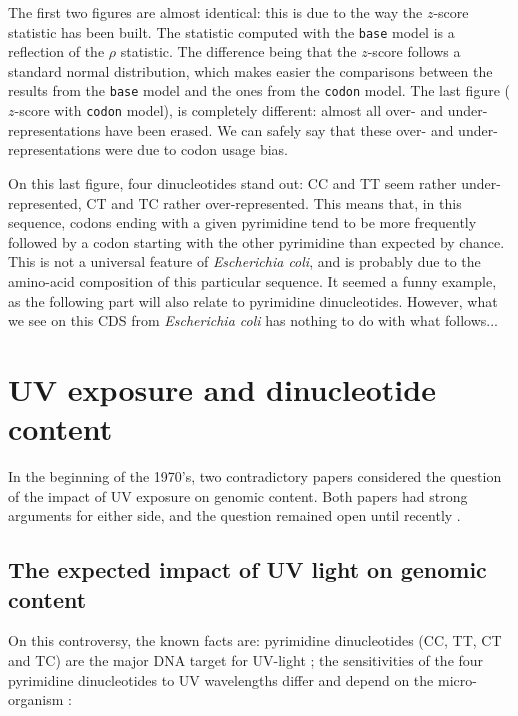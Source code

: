 \documentclass{article}
\begin{document}
The first two figures are almost identical: this is due to the way the
$z$-score statistic has been built. The statistic computed with
the \texttt{base} model is a reflection of the $\rho$ statistic. The
difference being that the $z$-score follows a standard normal
distribution, which makes easier the comparisons between the results
from the \texttt{base} model and the ones from the \texttt{codon}
model. The last figure ($z$-score with \texttt{codon} model), is
completely different: almost all over- and under-representations have
been erased. We can safely say that these over- and
under-representations were due to codon usage bias.

On this last figure, four dinucleotides stand out: CC and TT seem
rather under-represented, CT and TC rather over-represented. This
means that, in this sequence, codons ending with a given pyrimidine
tend to be more frequently followed by a codon starting with the other
pyrimidine than expected by chance. This is not a universal feature of
\textit{Escherichia coli}, and is probably due to the amino-acid
composition of this particular sequence. It seemed a funny example, as
the following part will also relate to pyrimidine dinucleotides.
However, what we see on this CDS from \textit{Escherichia coli} has
nothing to do with what follows...

\section{UV exposure and dinucleotide content}

In the beginning of the 1970's, two contradictory papers considered
the question of the impact of UV exposure on genomic content. Both
papers had strong arguments for either side, and the question remained
open until recently \cite{UV}.

\subsection{The expected impact of UV light on genomic content}

On this controversy, the known facts are: pyrimidine dinucleotides
(CC, TT, CT and TC) are the major DNA target for UV-light
\cite{Setlow}; the sensitivities of the four pyrimidine dinucleotides
to UV wavelengths differ and depend on the micro-organism
\cite{Setlow}:
\end{document}
